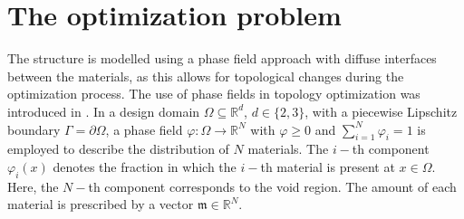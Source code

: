 \documentclass[a4paper,11pt]{article}
\theoremstyle{remark}
\newcommand{\R}{\mathbb{R}}
\newcommand{\mass}{\mathfrak{m}}
\begin{document}
\section{The optimization problem}
\label{sec:optProb}
The structure is modelled using a phase field approach with diffuse interfaces between the materials, as this allows for topological changes during the optimization process.
The use of phase fields in topology optimization was introduced in \cite{BourdinChambolle}.
In a design domain $\Omega\subseteq \R^d$, $d\in \{2,3\}$, with a piecewise Lipschitz boundary $\Gamma = \partial\Omega $, a phase field $\varphi:\Omega\to\R^N$ with $\varphi\geq 0$ and $\sum_{i=1}^N \varphi_i = 1$ is employed to describe the distribution of $N$ materials. 
The $i-$th component $\varphi_i(x)$ denotes the fraction in which the $i-$th material is present at $x\in\Omega$. Here, the $N-$th component corresponds to the void region.
The amount of each material is prescribed by a vector $\mass \in \R^N$.
\end{document}
